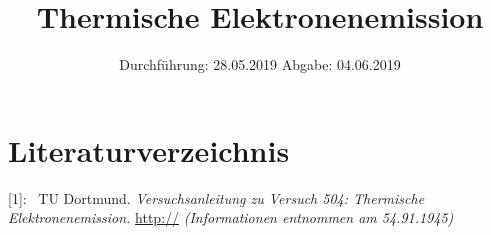 

\subject{Nr.504}
\title{Thermische Elektronenemission}
\date{
  Durchführung: 28.05.2019
  \hspace{3em}
  Abgabe: 04.06.2019
}



\maketitle
\thispagestyle{empty}
\tableofcontents
\newpage






\section{Literaturverzeichnis}

[1]: \ TU Dortmund. \textit{Versuchsanleitung zu Versuch 504:
Thermische Elektronenemission.}\newline
\url{http://}
\textit{(Informationen entnommen am 54.91.1945)}\newline

\printbibliography{}


